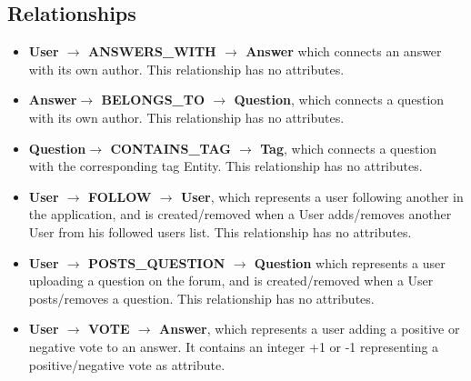 \documentclass[11pt]{report}
\begin{document}
    \subsection{Relationships}
        \begin{itemize}
            \item \textbf{User $\rightarrow$ ANSWERS\_WITH $\rightarrow$ Answer} which connects an answer with its own author.
            This relationship has no attributes.
            \item \textbf{Answer$\rightarrow$ BELONGS\_TO $\rightarrow$ Question}, which connects a question with its own author.
            This relationship has no attributes.
            \item \textbf{Question$\rightarrow$ CONTAINS\_TAG $\rightarrow$ Tag}, which connects a question with the corresponding tag Entity. This relationship has no attributes.
            \item \textbf{User $\rightarrow$ FOLLOW $\rightarrow$ User},  which represents a user
            following another in the application, and is
            created/removed when a User adds/removes another
            User from his followed users list.
            This relationship has no attributes.
            \item \textbf{User $\rightarrow$ POSTS\_QUESTION $\rightarrow$ Question} which represents a user
            uploading a question on the forum, and is created/removed when a User posts/removes a question. This relationship has no attributes.
            \item \textbf{User $\rightarrow$ VOTE $\rightarrow$ Answer}, which represents a user adding a positive or negative vote to an answer.
            It contains an integer +1 or -1 representing a positive/negative vote as attribute.
        \end{itemize}
    \newpage   
\end{document}
